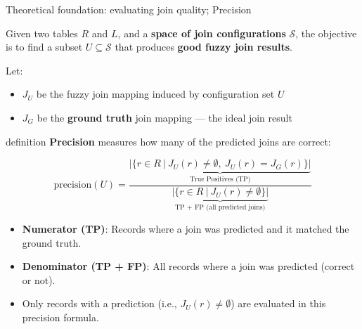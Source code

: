 \documentclass[8pt]{beamer} %
\begin{document}
\begin{frame}{Theoretical foundation: evaluating join quality; Precision}
	
	Given two tables $R$ and $L$, and a \textbf{space of join configurations} $\mathcal{S}$, the objective is to find a subset $U \subseteq \mathcal{S}$ that produces \textbf{good fuzzy join results}.
	
	Let:
	\begin{itemize}
		\item $J_U$ be the fuzzy join mapping induced by configuration set $U$
		\item $J_G$ be the \textbf{ground truth} join mapping — the ideal join result
	\end{itemize}
	
	\vspace{0.5em}
	
	\begin{beamercolorbox}[rounded=true, shadow=true, leftskip=1em, rightskip=1em]{definition}
		\textbf{Precision} measures how many of the predicted joins are correct:
		
		$$
		\text{precision}(U) =
		\frac{
			\underbrace{|\{ r \in R\ |\ J_U(r) \neq \emptyset,\ J_U(r) = J_G(r) \}|}_{\text{True Positives (TP)}}
		}{
			\underbrace{|\{ r \in R\ |\ J_U(r) \neq \emptyset \}|}_{\text{TP + FP (all predicted joins)}}
		}
		$$
	\end{beamercolorbox}
	
	\begin{itemize}
		\item \textbf{Numerator (TP)}: Records where a join was predicted and it matched the ground truth.
		\item \textbf{Denominator (TP + FP)}: All records where a join was predicted (correct or not).
		\item Only records with a prediction (i.e., $J_U(r) \neq \emptyset$) are evaluated in this precision formula.
	\end{itemize}
	
\end{frame}
\end{document}
